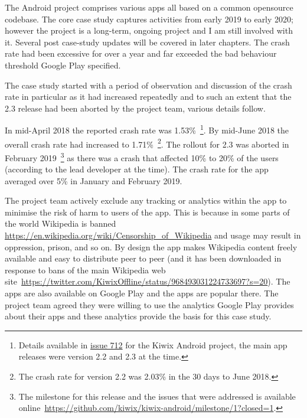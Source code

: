 The Android project comprises various apps all based on a common opensource codebase. The core case study captures activities from early 2019 to early 2020; however the project is a long-term, ongoing project and I am still involved with it. Several post case-study updates will be covered in later chapters. The crash rate had been excessive for over a year and far exceeded the bad behaviour threshold Google Play specified. 

The case study started with a period of observation and discussion of the crash rate in particular as it had increased repeatedly and to such an extent that the 2.3 release had been aborted by the project team, various details follow.

In mid-April 2018 the reported crash rate was 1.53\%~\footnote{Details available in \href{https://github.com/kiwix/kiwix-android/issues/712}{issue 712} for the Kiwix Android project, the main app releases were version 2.2 and 2.3 at the time.}. By mid-June 2018 the overall crash rate had increased to 1.71\%~\footnote{The crash rate for version 2.2 was 2.03\% in the 30 days to  June 2018.}. The rollout for 2.3 was aborted in February 2019~\footnote{The milestone for this release and the issues that were addressed is available online~\url{https://github.com/kiwix/kiwix-android/milestone/1?closed=1}.} as there was a crash that affected 10\% to 20\% of the users (according to the lead developer at the time). The crash rate for the app averaged over 5\% in January and February 2019. 



The project team actively exclude any tracking or analytics within the app to minimise the risk of harm to users of the app. This is because in some parts of the world Wikipedia is banned \url{https://en.wikipedia.org/wiki/Censorship\_of\_Wikipedia} and usage may result in oppression, prison, and so on. By design the app makes Wikipedia content freely available and easy to distribute peer to peer (and it has been downloaded in response to bans of the main Wikipedia web site~\url{https://twitter.com/KiwixOffline/status/968493031224733697?s=20}). The apps are also available on Google Play and the apps are popular there. The project team agreed they were willing to use the analytics Google Play provides about their apps and these analytics provide the basis for this case study.

